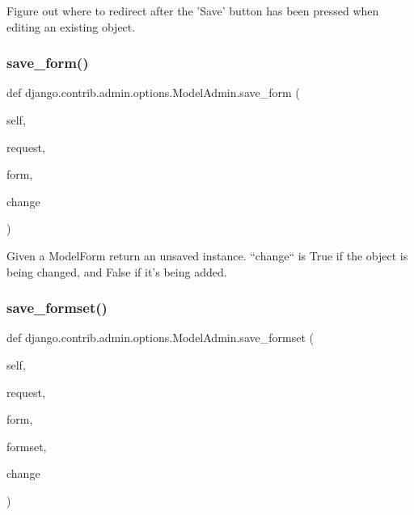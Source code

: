 \begin{DoxyVerb}Figure out where to redirect after the 'Save' button has been pressed
when editing an existing object.
\end{DoxyVerb}
 \mbox{\label{classdjango_1_1contrib_1_1admin_1_1options_1_1_model_admin_a12a97f6122978f998d92d24b11c086db}} 
\subsubsection{\texorpdfstring{save\+\_\+form()}{save\_form()}}
{\footnotesize\ttfamily def django.\+contrib.\+admin.\+options.\+Model\+Admin.\+save\+\_\+form (\begin{DoxyParamCaption}\item[{}]{self,  }\item[{}]{request,  }\item[{}]{form,  }\item[{}]{change }\end{DoxyParamCaption})}

\begin{DoxyVerb}Given a ModelForm return an unsaved instance. ``change`` is True if
the object is being changed, and False if it's being added.
\end{DoxyVerb}
 \mbox{\label{classdjango_1_1contrib_1_1admin_1_1options_1_1_model_admin_a7dd8430cd0a83b84927b16e1e335c678}} 
\subsubsection{\texorpdfstring{save\+\_\+formset()}{save\_formset()}}
{\footnotesize\ttfamily def django.\+contrib.\+admin.\+options.\+Model\+Admin.\+save\+\_\+formset (\begin{DoxyParamCaption}\item[{}]{self,  }\item[{}]{request,  }\item[{}]{form,  }\item[{}]{formset,  }\item[{}]{change }\end{DoxyParamCaption})}

